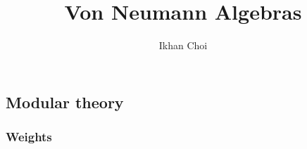 \documentclass{../../large}
\begin{document}
\title{Von Neumann Algebras}
\author{Ikhan Choi}
\maketitle
\tableofcontents

\iffalse
Connes embeddability
property Gamma
Connes' bicentralizer problem
Shlyakhtenko semicircular system
group stability
bimodule
noncommutative probability
\fi


\part{}




\chapter{Modular theory}



\section{Weights}
\end{document}
